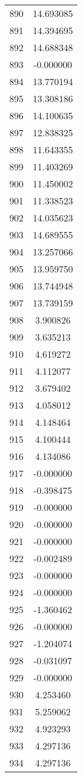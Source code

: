 \documentclass[12pt]{article}
\begin{document}
\begin{longtable}{@{}cc@{}}
890 & 14.693085 \\
891 & 14.394695 \\
892 & 14.688348 \\
893 & -0.000000 \\
894 & 13.770194 \\
895 & 13.308186 \\
896 & 14.100635 \\
897 & 12.838325 \\
898 & 11.643355 \\
899 & 11.403269 \\
900 & 11.450002 \\
901 & 11.338523 \\
902 & 14.035623 \\
903 & 14.689555 \\
904 & 13.257066 \\
905 & 13.959750 \\
906 & 13.744948 \\
907 & 13.739159 \\
908 & 3.900826 \\
909 & 3.635213 \\
910 & 4.619272 \\
911 & 4.112077 \\
912 & 3.679402 \\
913 & 4.058012 \\
914 & 4.148464 \\
915 & 4.100444 \\
916 & 4.134086 \\
917 & -0.000000 \\
918 & -0.398475 \\
919 & -0.000000 \\
920 & -0.000000 \\
921 & -0.000000 \\
922 & -0.002489 \\
923 & -0.000000 \\
924 & -0.000000 \\
925 & -1.360462 \\
926 & -0.000000 \\
927 & -1.204074 \\
928 & -0.031097 \\
929 & -0.000000 \\
930 & 4.253460 \\
931 & 5.259062 \\
932 & 4.923293 \\
933 & 4.297136 \\
934 & 4.297136 \\

\end{longtable}
\end{document}
